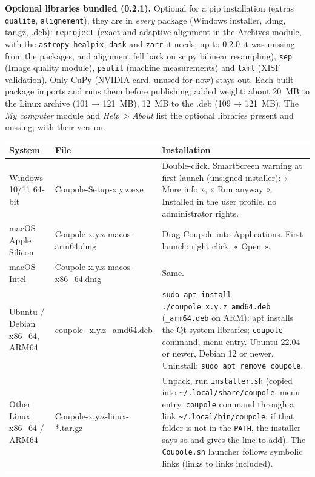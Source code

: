 \textbf{Optional libraries bundled (0.2.1).} Optional for a pip installation (extras \texttt{qualite},
\texttt{alignement}), they are in \emph{every} package (Windows installer, .dmg, tar.gz, .deb): \texttt{reproject}
(exact and adaptive alignment in the Archives module, with the \texttt{astropy-healpix}, \texttt{dask} and
\texttt{zarr} it needs; up to 0.2.0 it was missing from the packages, and alignment fell back on scipy bilinear
resampling), \texttt{sep} (Image quality module), \texttt{psutil} (machine measurements) and \texttt{lxml} (XISF
validation). Only CuPy (NVIDIA card, unused for now) stays out. Each built package imports and runs them before
publishing; added weight: about 20~MB to the Linux archive (101 → 121~MB), 12~MB to the .deb (109 → 121~MB). The
\emph{My computer} module and \emph{Help > About} list the optional libraries present and missing, with their
version.

\begin{center}\small
\begin{tabularx}{\linewidth}{@{}l>{\ttfamily\small}lX@{}}
\toprule
\textbf{System} & \textbf{\normalfont File} & \textbf{Installation}\\
\midrule
Windows 10/11 64-bit & Coupole-Setup-x.y.z.exe & Double-click. SmartScreen warning at first launch (unsigned installer): « More info », « Run anyway ». Installed in the user profile, no administrator rights.\\
macOS Apple Silicon & Coupole-x.y.z-macos-arm64.dmg & Drag Coupole into Applications. First launch: right click, « Open ».\\
macOS Intel & Coupole-x.y.z-macos-x86\_64.dmg & Same.\\
Ubuntu / Debian x86\_64, ARM64 & coupole\_x.y.z\_amd64.deb & \texttt{sudo apt install ./coupole\_x.y.z\_amd64.deb} (\texttt{\_arm64.deb} on ARM): apt installs the Qt system libraries; \texttt{coupole} command, menu entry. Ubuntu 22.04 or newer, Debian 12 or newer. Uninstall: \texttt{sudo apt remove coupole}.\\
Other Linux x86\_64 / ARM64 & Coupole-x.y.z-linux-*.tar.gz & Unpack, run \texttt{installer.sh} (copied into \texttt{\textasciitilde/.local/share/coupole}, menu entry, \texttt{coupole} command through a link \texttt{\textasciitilde/.local/bin/coupole}; if that folder is not in the \texttt{PATH}, the installer says so and gives the line to add). The \texttt{Coupole.sh} launcher follows symbolic links (links to links included).\\
\bottomrule
\end{tabularx}
\end{center}

